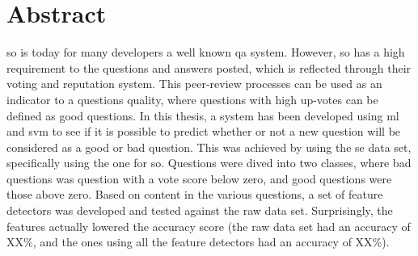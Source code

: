 \chapter*{Abstract}
\gls{so} is today for many developers a well known \gls{qa} system. 
However, \gls{so} has a high requirement to the questions and answers posted, which is reflected through their voting and reputation system. 
This peer-review processes can be used as an indicator to a questions quality, where questions with high up-votes can be defined as good questions.
In this thesis, a system has been developed using  \gls{ml} and \gls{svm} to see if it is possible to predict whether or not a new question will be 
considered as a good or bad question. 
\vspace{0.5em}\newline
This was achieved by using the \gls{se} data set, specifically using the one for \gls{so}. 
Questions were dived into two classes, where bad questions was question with a vote score below zero, and good questions were those above zero. 
Based on content in the various questions, a set of feature detectors was developed and tested against the raw data set. 
Surprisingly, the features actually lowered the accuracy score (the raw data set had an accuracy of XX\%, and the ones using all the feature detectors had an accuracy of XX\%). \\
%


